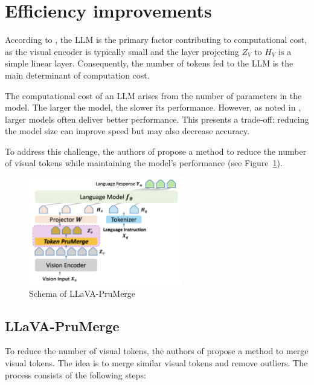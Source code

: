 \documentclass[onecolumn]{IEEEtran}
\begin{document}
\section{Efficiency improvements}
According to \cite{shang2024LLaVA-PruMerge}, the LLM is the primary factor contributing to computational cost, as the visual encoder is typically small and the layer projecting $Z_V$ to $H_V$ is a simple linear layer. Consequently, the number of tokens fed to the LLM is the main determinant of computation cost.  

The computational cost of an LLM arises from the number of parameters in the model. The larger the model, the slower its performance. However, as noted in \cite{wu2024performance}, larger models often deliver better performance. This presents a trade-off: reducing the model size can improve speed but may also decrease accuracy.  

To address this challenge, the authors of \cite{shang2024LLaVA-PruMerge} propose a method to reduce the number of visual tokens while maintaining the model's performance (see Figure~\ref{fig:llava-prumerge-schema}).  

\begin{figure}[H]
    \centering
    \includegraphics[width=0.6\textwidth]{images/purmerge-architecture.png}
    \caption{Schema of LLaVA-PruMerge \cite{shang2024LLaVA-PruMerge}}
    \label{fig:llava-prumerge-schema}
\end{figure}

\subsection{LLaVA-PruMerge}
To reduce the number of visual tokens, the authors of \cite{shang2024LLaVA-PruMerge} propose a method to merge visual tokens. The idea is to merge similar visual tokens and remove outliers. The process consists of the following steps:
\end{document}
